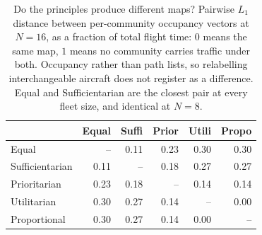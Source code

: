 \begin{table}[t]
\centering
\caption{Do the principles produce different maps? Pairwise $L_1$ distance between per-community occupancy vectors at $N{=}16$, as a fraction of total flight time: $0$ means the same map, $1$ means no community carries traffic under both. Occupancy rather than path lists, so relabelling interchangeable aircraft does not register as a difference. Equal and Sufficientarian are the closest pair at every fleet size, and identical at $N{=}8$.}
\label{tab:distinct}
\begin{tabular}{lrrrrr}
\toprule
 & Equal & Suffi & Prior & Utili & Propo \\
\midrule
Equal & -- & 0.11 & 0.23 & 0.30 & 0.30 \\
Sufficientarian & 0.11 & -- & 0.18 & 0.27 & 0.27 \\
Prioritarian & 0.23 & 0.18 & -- & 0.14 & 0.14 \\
Utilitarian & 0.30 & 0.27 & 0.14 & -- & 0.00 \\
Proportional & 0.30 & 0.27 & 0.14 & 0.00 & -- \\
\bottomrule
\end{tabular}
\end{table}
